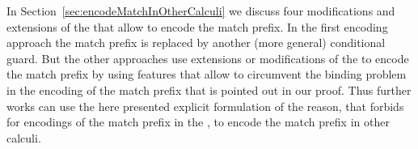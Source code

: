 \documentclass[]{article}
\begin{document}
In Section~\ref{sec:encodeMatchInOtherCalculi} we discuss four modifications and extensions of the \piCal that allow to encode the match prefix. 
In the first encoding approach the match prefix is replaced by another (more general) conditional guard. But the other approaches use extensions or modifications of the \piCal to encode the match prefix by using features that allow to circumvent the binding problem in the encoding of the match prefix that is pointed out in our proof.
Thus further works can use the here presented explicit formulation of the reason, that forbids for encodings of the match prefix in the \piCal, to encode the match prefix in other calculi.



\end{document}
